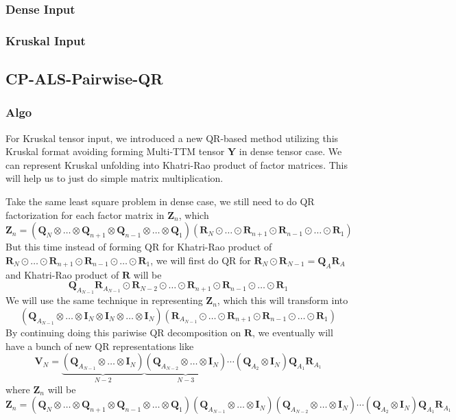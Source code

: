 \documentclass{article}
\newcommand{\mat}[1]{\mathbf{#1}}
\begin{document}
\subsubsection{Dense Input}

\subsubsection{Kruskal Input}



\subsection{CP-ALS-Pairwise-QR}
\subsubsection{Algo}
For Kruskal tensor input, we introduced a new QR-based method utilizing this Kruskal format avoiding
forming Multi-TTM tensor $\mat{Y}$ in dense tensor case. We can represent Kruskal unfolding into
Khatri-Rao product of factor matrices. This will help us to just do simple matrix multiplication.

Take the same least square problem in dense case, we still need to do QR factorization for each factor matrix in $\mat{Z}_n$, which
$$\mat{Z}_n = (\mat{Q}_N \otimes \dots \otimes \mat{Q}_{n+1} \otimes \mat{Q}_{n-1} \otimes \dots \otimes \mat{Q}_1)(\mat{R}_N \odot \dots \odot \mat{R}_{n+1} \odot \mat{R}_{n-1} \odot \dots \odot \mat{R}_1)$$
But this time instead of forming QR for Khatri-Rao product of $\mat{R}_N \odot \dots \odot \mat{R}_{n+1} \odot \mat{R}_{n-1} \odot \dots \odot \mat{R}_1$, we will first do QR for $\mat{R}_N \odot \mat{R}_{N-1} = \mat{Q}_{A}\mat{R}_A$ and Khatri-Rao product of $\mat{R}$ will be 
$$\mat{Q}_{A_{N-1}}\mat{R}_{A_{N-1}} \odot \mat{R}_{N-2} \odot \dots \odot \mat{R}_{n+1} \odot \mat{R}_{n-1} \odot \dots \odot \mat{R}_1$$
We will use the same technique in representing $\mat{Z}_n$, which this will transform into 
$$(\mat{Q}_{A_{N-1}} \otimes \dots \otimes \mat{I}_N \otimes \mat{I}_N \otimes \dots  \otimes  \mat{I}_N)(\mat{R}_{A_{N-1}} \odot \dots \odot \mat{R}_{n+1} \odot \mat{R}_{n-1} \odot \dots \odot \mat{R}_1)$$
By continuing doing this pariwise QR decomposition on $\mat{R}$, we eventually will have a bunch of new QR representations like
$$\mat{V}_N = \underbrace{(\mat{Q}_{A_{N-1}} \otimes \dots  \otimes  \mat{I}_N)}_{N-2}\underbrace{(\mat{Q}_{A_{N-2}} \otimes \dots \otimes \mat{I}_N)}_{N-3} \cdots (\mat{Q}_{A_{2}} \otimes \mat{I}_N) \mat{Q}_{A_{1}}\mat{R}_{A_{1}}$$
where $\mat{Z}_n$ will be 
$$\mat{Z}_n = (\mat{Q}_N \otimes \dots \otimes \mat{Q}_{n+1} \otimes \mat{Q}_{n-1} \otimes \dots \otimes \mat{Q}_1) (\mat{Q}_{A_{N-1}} \otimes \dots  \otimes  \mat{I}_N)(\mat{Q}_{A_{N-2}} \otimes \dots \otimes \mat{I}_N) \cdots (\mat{Q}_{A_{2}} \otimes \mat{I}_N) \mat{Q}_{A_{1}}\mat{R}_{A_{1}}$$
\end{document}

